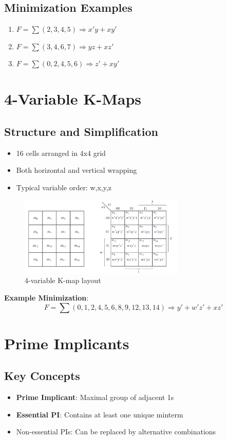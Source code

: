 \documentclass[11pt]{article}
\begin{document}
\subsection{Minimization Examples}
\begin{enumerate}
\item $F = \sum(2,3,4,5) \Rightarrow x'y + xy'$
\item $F = \sum(3,4,6,7) \Rightarrow yz + xz'$
\item $F = \sum(0,2,4,5,6) \Rightarrow z' + xy'$
\end{enumerate}

\section{4-Variable K-Maps}
\subsection{Structure and Simplification}
\begin{itemize}
\item 16 cells arranged in 4x4 grid
\item Both horizontal and vertical wrapping
\item Typical variable order: w,x,y,z
\end{itemize}

\begin{figure}[htbp]
\centering
\includegraphics[width=0.7\textwidth]{figs/4var.png}
\caption{4-variable K-map layout}
\label{fig:4var}
\end{figure}

\textbf{Example Minimization}:
\begin{equation}
F = \sum(0,1,2,4,5,6,8,9,12,13,14) \Rightarrow y' + w'z' + xz'
\end{equation}

\section{Prime Implicants}
\subsection{Key Concepts}
\begin{itemize}
\item \textbf{Prime Implicant}: Maximal group of adjacent 1s
\item \textbf{Essential PI}: Contains at least one unique minterm
\item Non-essential PIs: Can be replaced by alternative combinations
\end{itemize}
\end{document}
